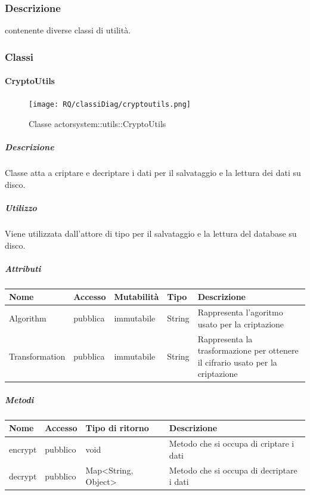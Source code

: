 \documentclass{scalatekids-article}
\begin{document}
\subsubsection{Descrizione}
 contenente diverse classi di utilità.

\subsubsection{Classi}


\paragraph{CryptoUtils}
\label{sec:actorbase::actorsystem::utils::CryptoUtils}

\begin{figure}[H]
  \begin{center}
    \texttt{[image: RQ/classiDiag/cryptoutils.png]}
    \caption{Classe actorsystem::utils::CryptoUtils}
  \end{center}
\end{figure}

\subparagraph{Descrizione}
Classe atta a criptare e decriptare i dati per il salvataggio e la lettura dei dati su disco.

\subparagraph{Utilizzo}
Viene utilizzata dall'attore di tipo  per il salvataggio e la lettura del database su disco.

\subparagraph{Attributi}
\begin{tabular}{| p{3cm} | p{1.5cm} | p{2cm} | p{2cm} | p{8.5cm} |}
  \hline
  Nome & Accesso & Mutabilità & Tipo & Descrizione\\
  \hline
  Algorithm & pubblica & immutabile & String & Rappresenta l'agoritmo usato per la criptazione \\
  \hline
  Transformation & pubblica & immutabile & String & Rappresenta la trasformazione per ottenere il cifrario usato per la criptazione \\
  \hline
\end{tabular}

\subparagraph{Metodi}
\begin{tabular}{| p{3cm} | p{1.5cm} | p{3.5cm} | p{9cm} |}
  \hline
  Nome & Accesso & Tipo di ritorno & Descrizione\\
  \hline
  encrypt & pubblico & void & Metodo che si occupa di criptare i dati \\
  \hline
  decrypt & pubblico & Map<String, Object> & Metodo che si occupa di decriptare i dati \\
  \hline
\end{tabular}
\end{document}
